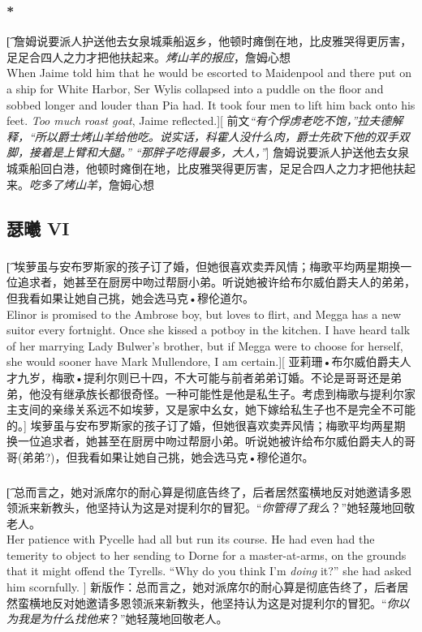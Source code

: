 \documentclass[12pt,a4paper]{article}
\begin{document}
\subsubsection{\color{red}*}\t[	 
	 詹姆说要派人护送他去女泉城乘船返乡，他顿时瘫倒在地，比皮雅哭得更厉害，足足合四人之力才把他扶起来。\emph{烤山羊的报应}，詹姆心想\\
	 When Jaime told him that he would be escorted to Maidenpool and there put on a ship for White Harbor, Ser Wylis collapsed into a puddle on the floor and sobbed longer and louder than Pia had. It took four men to lift him back onto his feet. \emph{Too much roast goat}, Jaime reflected.][
	 前文\emph{“有个俘虏老吃不饱，”拉夫德解释，“所以爵士烤山羊给他吃。说实话，科霍人没什么肉，爵士先砍下他的双手双脚，接着是上臂和大腿。” “那胖子吃得最多，大人，”}]
	 詹姆说要派人护送他去女泉城乘船回白港，他顿时瘫倒在地，比皮雅哭得更厉害，足足合四人之力才把他扶起来。\emph{吃多了烤山羊}，詹姆心想
	 
	 
\subsection{瑟曦 VI}
\subsubsection{}\t[
	埃萝虽与安布罗斯家的孩子订了婚，但她很喜欢卖弄风情；梅歌平均两星期换一位追求者，她甚至在厨房中吻过帮厨小弟。听说她被许给布尔威伯爵夫人的弟弟，但我看如果让她自己挑，她会选马克•穆伦道尔。\\
	Elinor is promised to the Ambrose boy, but loves to flirt, and Megga has a new suitor every fortnight. Once she kissed a potboy in the kitchen. I have heard talk of her marrying Lady Bulwer's brother, but if Megga were to choose for herself, she would sooner have Mark Mullendore, I am certain.][
	亚莉珊•布尔威伯爵夫人才九岁，梅歌•提利尔则已十四，不大可能与前者弟弟订婚。不论是哥哥还是弟弟，他没有继承族长都很奇怪。一种可能性是他是私生子。考虑到梅歌与提利尔家主支间的亲缘关系远不如埃萝，又是家中幺女，她下嫁给私生子也不是完全不可能的。]
	埃萝虽与安布罗斯家的孩子订了婚，但她很喜欢卖弄风情；梅歌平均两星期换一位追求者，她甚至在厨房中吻过帮厨小弟。听说她被许给布尔威伯爵夫人的哥哥(弟弟?)，但我看如果让她自己挑，她会选马克•穆伦道尔。

\subsubsection{}\t[
	总而言之，她对派席尔的耐心算是彻底告终了，后者居然蛮横地反对她邀请多恩领派来新教头，他坚持认为这是对提利尔的冒犯。“\emph{你管得了我么}？”她轻蔑地回敬老人。\\
	Her patience with Pycelle had all but run its course. He had even had the temerity to object to her sending to Dorne for a master-at-arms, on the grounds that it might offend the Tyrells. “Why do you think I'm \emph{doing} it?” she had asked him scornfully. ]
	新版作：总而言之，她对派席尔的耐心算是彻底告终了，后者居然蛮横地反对她邀请多恩领派来新教头，他坚持认为这是对提利尔的冒犯。“\emph{你以为我是为什么找他来}？”她轻蔑地回敬老人。
	
\end{document}

